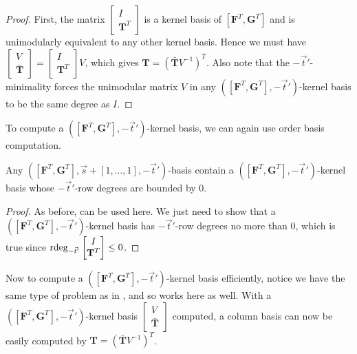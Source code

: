 \begin{proof}
First, the matrix $\begin{bmatrix}I\\
\mathbf{T}^{T}
\end{bmatrix}$ is a kernel basis of $\left[\mathbf{F}^{T},\mathbf{G}^{T}\right]$
and is unimodularly equivalent to any other kernel basis. Hence we
must have $\begin{bmatrix}V\\
\bar{\mathbf{T}}
\end{bmatrix}=\begin{bmatrix}I\\
\mathbf{T}^{T}
\end{bmatrix}V$, which gives $\mathbf{T}=\left(\bar{\mathbf{T}}V^{-1}\right)^{T}$.
Also note that the $-\vec{t}'$-minimality forces the unimodular matrix
$V$ in any $\left(\left[\mathbf{F}^{T},\mathbf{G}^{T}\right],-\vec{t}'\right)$-kernel
basis to be the same degree as $I$.
\end{proof}
To compute a $\left(\left[\mathbf{F}^{T},\mathbf{G}^{T}\right],-\vec{t}'\right)$-kernel
basis, we can again use order basis computation.
\begin{lem}
Any $\left(\left[\mathbf{F}^{T},\mathbf{G}^{T}\right],\vec{s}+\left[1,\dots,1\right],-\vec{t}'\right)$-basis
contain a $\left(\left[\mathbf{F}^{T},\mathbf{G}^{T}\right],-\vec{t}'\right)$-kernel
basis whose $-\vec{t}'$-row degrees are bounded by 0.\end{lem}
\begin{proof}
As before, 
can be used here. We just need to show that a $\left(\left[\mathbf{F}^{T},\mathbf{G}^{T}\right],-\vec{t}'\right)$-kernel
basis has $-\vec{t}'$-row degrees no more than 0, which is true since
$\rdeg_{-\vec{t}'}\begin{bmatrix}I\\
\mathbf{T}^{T}
\end{bmatrix}\le0$.
\end{proof}
Now to compute a $\left(\left[\mathbf{F}^{T},\mathbf{G}^{T}\right],-\vec{t}'\right)$-kernel
basis efficiently, notice we have the same type of problem as in ,
and so  works here as
well. With a $\left(\left[\mathbf{F}^{T},\mathbf{G}^{T}\right],-\vec{t}'\right)$-kernel
basis $\begin{bmatrix}V\\
\bar{\mathbf{T}}
\end{bmatrix}$ computed, a column basis can now be easily computed by $\mathbf{T}=\left(\bar{\mathbf{T}}V^{-1}\right)^{T}$.

